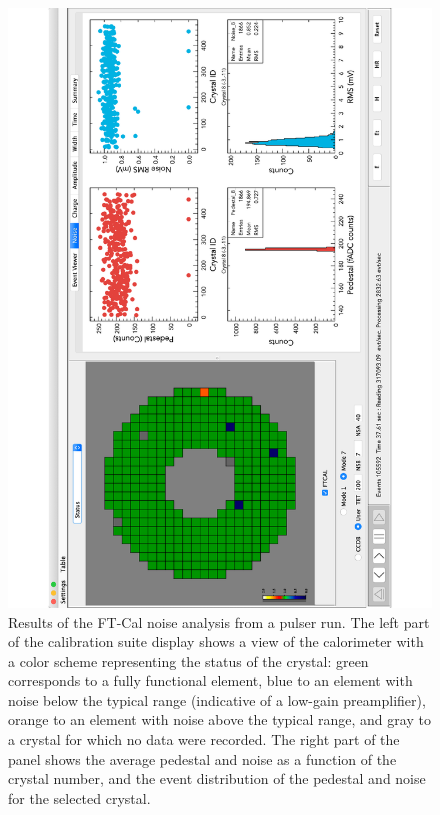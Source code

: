 \begin{figure}
\includegraphics[height=1.0\columnwidth,angle=270]{fig/ftcal_pulserrun.pdf}
\caption{Results of the FT-Cal noise analysis from a pulser run. The left part of the calibration suite display shows a
  view of the calorimeter with a color scheme representing the status of the crystal: green corresponds to a fully
  functional element, blue to an element with noise below the typical range (indicative of a low-gain preamplifier),
  orange to an element with noise above the typical range, and gray to a crystal for which no data were recorded. The
  right part of the panel shows the average pedestal and noise as a function of the crystal number, and the event
  distribution of the pedestal and noise for the selected crystal.}
\label{fig:ftcal_pulserrun}
\end{figure}

